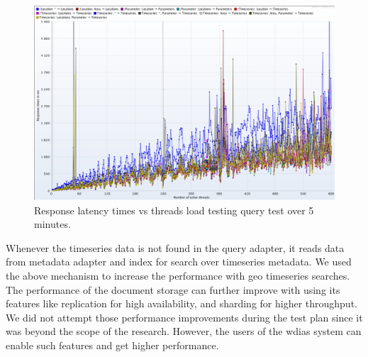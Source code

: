 \begin{figure}[htp]
    \centering
    \includegraphics[width=1.0\textwidth]{results/obs/query/obs_query_5m_response_times_vs_threads.png}
    \caption{Response latency times vs threads load testing query test over 5 minutes.}
    \label{fi:test_obs_query_5m_response_times_vs_threads}
\end{figure}

Whenever the timeseries data is not found in the query adapter, it reads data from metadata adapter and index for search over timeseries metadata. We used the above mechanism to increase the performance with geo timeseries searches. The performance of the document storage can further improve with using its features like replication for high availability, and sharding for higher throughput.
We did not attempt those performance improvements during the test plan since it was beyond the scope of the research. However, the users of the \acrshort{wdias} system can enable such features and get higher performance.
